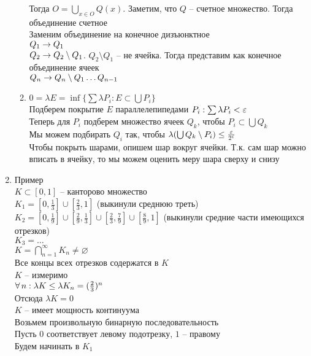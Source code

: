 \documentclass[12pt]{article}
\begin{document}
\begin{enumerate}
\begin{enumerate}
        Тогда $O = \bigcup_{x\in O} Q(x)$. Заметим, что $Q$ -- счетное множество. Тогда объединение счетное\\
        Заменим объединение на конечное дизъюнктное\\
        $Q_1 \rightarrow Q_1$\\
        $Q_2 \rightarrow Q_2 \setminus Q_1$. $Q_2 \setminus Q_1$ -- не ячейка. Тогда представим как конечное объединение ячеек\\
        $Q_n \rightarrow Q_n \setminus Q_1 \ldots Q_{n-1}$
        \item $0 = \lambda E = \inf \{\sum \lambda P_i: E \subset \bigcup P_i\}$\\
        Подберем покрытие $E$ параллелепипедами $P_i: \sum \lambda P_i < \varepsilon$\\
        Теперь для $P_i$ подберем множество ячеек $Q_k$, чтобы $P_i \subset \bigcup Q_k$\\
        Мы можем подбирать $Q_i$ так, чтобы $\lambda (\bigcup Q_k \setminus P_i) \leq \frac{\varepsilon}{2^i}$\\
        Чтобы покрыть шарами, опишем шар вокруг ячейки. Т.к. сам шар можно вписать в ячейку, то мы можем оценить меру шара сверху и снизу
    \end{enumerate}
    \item Пример\\
    $K \subset [0,1]$ -- канторово множество\\
    $K_1 = [0, \frac13]\cup [\frac23, 1]$ (выкинули среднюю треть)\\
    $K_2 = [0, \frac19] \cup [\frac29, \frac13] \cup [\frac23,\frac79] \cup [\frac89, 1]$ (выкинули средние части имеющихся отрезков)\\
    $K_3 = \ldots$\\
    $K = \bigcap_{n=1}^{\infty} K_n \neq \varnothing$\\
    Все концы всех отрезков содержатся в $K$\\
    $K$ -- измеримо\\
    $\forall\, n: \lambda K \leq \lambda K_n = (\frac23)^n$\\
    Отсюда $\lambda K = 0$\\
    $K$ -- имеет мощность континуума\\
    Возьмем произвольную бинарную последовательность\\
    Пусть $0$ соответствует левому подотрезку, $1$ -- правому\\
    Будем начинать в $K_1$\\

\end{enumerate}
\end{document}
